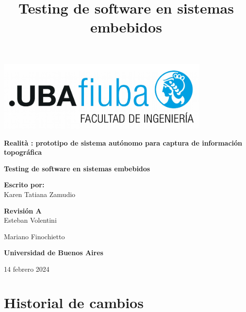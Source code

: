 \documentclass[12pt,a4paper, twoside]{article} %
\date{}
\title{Testing de software en sistemas embebidos}
\begin{document}
\renewcommand\refname{}
\renewcommand{\contentsname}{Tabla de contenido}
\newpage

\begin{titlepage}
    \begin{center}
        \vspace*{1cm}

                \includegraphics[width=0.8\textwidth]{Figuras/logoFIUBA.pdf} %

        \vspace{1.5cm}

        \textbf{\LARGE Realità : prototipo de sistema autónomo para captura de información topográfica}

        \vspace{4cm}
        \textbf{\Large Testing de software en sistemas embebidos}

        \vspace{1.5cm}


        \textbf{\Large Escrito por:}\\
        \large Karen Tatiana Zamudio

        \vspace{0.8cm}

        \textbf{\Large Revisión A}\\
        \large Esteban Volentini

        \large Mariano Finochietto

        \vfill

        \textbf{\Large Universidad de Buenos Aires}\\
        \vspace{0.2cm}

        \large 14 febrero 2024

    \end{center}
\end{titlepage}
\newpage

\section*{Historial de cambios}
\label{sec:registro}
\end{document}
